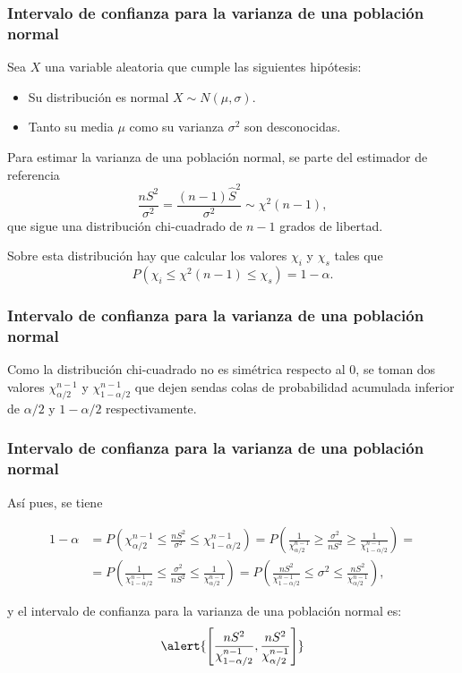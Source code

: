 \begin{frame}
\frametitle{Intervalo de confianza para la varianza de una población normal}
Sea $X$ una variable aleatoria que cumple las siguientes hipótesis:
\begin{itemize}
\item Su distribución es normal $X\sim N(\mu,\sigma)$.
\item Tanto su media $\mu$ como su varianza $\sigma^2$ son desconocidas.
\end{itemize}

Para estimar la varianza de una población normal, se parte del estimador de referencia
\[
\frac{nS^2}{\sigma^2} = \frac{(n-1)\hat{S}^2}{\sigma^2}\sim \chi^2(n-1),
\]
que sigue una distribución chi-cuadrado de $n-1$ grados de libertad.

Sobre esta distribución hay que calcular los valores $\chi_i$ y $\chi_s$ tales que
\[
P(\chi_i\leq \chi^2(n-1) \leq \chi_s) = 1-\alpha.
\]
\end{frame}


\begin{frame}
\frametitle{Intervalo de confianza para la varianza de una población normal}
Como la distribución chi-cuadrado no es simétrica respecto al 0, se toman dos valores $\chi^{n-1}_{\alpha/2}$ y $\chi^{n-1}_{1-\alpha/2}$ que dejen sendas colas de probabilidad acumulada inferior de $\alpha/2$ y $1-\alpha/2$ respectivamente.
\begin{center}
\scalebox{0.8}{}
\end{center}
\end{frame}


\begin{frame}
\frametitle{Intervalo de confianza para la varianza de una población normal}
Así pues, se tiene

\begin{align*}
1-\alpha &= P\left(\chi^{n-1}_{\alpha/2}\leq \frac{nS^2}{\sigma^2}  \leq \chi^{n-1}_{1-\alpha/2}\right) =
P\left(\frac{1}{\chi^{n-1}_{\alpha/2}}\geq \frac{\sigma^2}{nS^2}  \geq \frac{1}{\chi^{n-1}_{1-\alpha/2}}\right)=\\
&= P\left(\frac{1}{\chi^{n-1}_{1-\alpha/2}}\leq \frac{\sigma^2}{nS^2}  \leq \frac{1}{\chi^{n-1}_{\alpha/2}}\right)
= P\left(\frac{nS^2}{\chi^{n-1}_{1-\alpha/2}}\leq \sigma^2  \leq \frac{nS^2}{\chi^{n-1}_{\alpha/2}}\right),
\end{align*}

y el intervalo de confianza para la varianza de una población normal es:
\[
\alert{\left[\frac{nS^2}{\chi^{n-1}_{1-\alpha/2}},\frac{nS^2}{\chi^{n-1}_{\alpha/2}}\right]}
\]
\end{frame}


